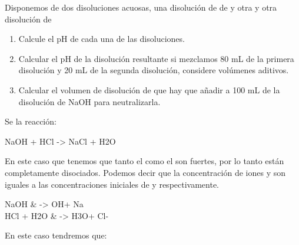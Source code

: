 \begin{exerciseEVAU}
    Disponemos de dos disoluciones acuosas, una disolución de  de  y otra y otra disolución  de 
    \begin{enumerate}[label=\letraminuscula]
        \item Calcule el pH de cada una de las disoluciones.
        \item Calcular el pH de la disolución resultante si mezclamos 80 mL de la primera disolución y 20 mL de la segunda disolución, considere volúmenes aditivos.
        \item Calcular el volumen de disolución de  que hay que añadir a 100 mL de la disolución de NaOH para neutralizarla.
    \end{enumerate}

    \begin{solu}
        Se la reacción:
        \begin{reaction*}
            NaOH + HCl -> NaCl + H2O
        \end{reaction*}
        En este caso que tenemos que tanto el  como el  son fuertes, por lo tanto están completamente disociados. Podemos decir que la concentración de iones  y  son iguales a las concentraciones iniciales de  y  respectivamente.
        \begin{reactions*}
            NaOH & -> OH\mch[] + Na\\
            HCl + H2O & -> H3O\pch[] + Cl-\\
        \end{reactions*}
        En este caso tendremos que:




\end{solu}
\end{exerciseEVAU}
